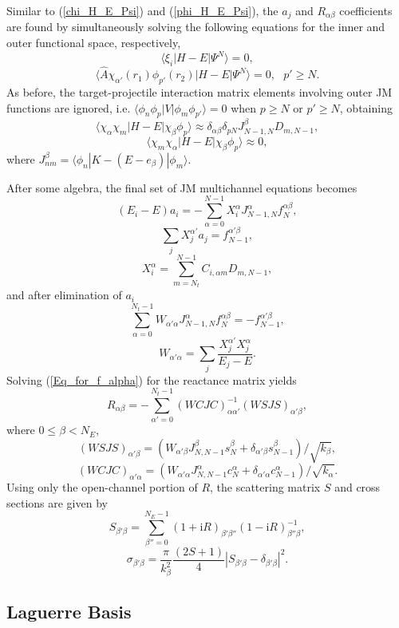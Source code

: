 \documentclass[aip,pra,showpacs,aps,twocolumn,groupedaddress,floatfix]{revtex4}
\newcommand{\beq}{\begin{equation}}
\newcommand{\eeq}{\end{equation}}
\begin{document}
Similar to (\ref{chi_H_E_Psi}) and (\ref{phi_H_E_Psi}), the $a_j$ and $R_{\alpha \beta}$ coefficients are found by
simultaneously solving the following equations for the inner and outer functional space, respectively,
\beq
\langle\xi_i|H-E|\Psi^N\rangle=0,  \label{xi_H_E_Psi}
\eeq
\beq
\langle \hat{A} \chi_{\alpha'}(r_1) \phi_{p'}(r_2)|H-E|\Psi^N\rangle=0 , \ \ \ p' \geq N. \label{chi_phi_H_E_Psi}
\eeq
As before, the target-projectile interaction matrix elements involving outer JM functions are ignored, i.e.
$\langle \phi_n \phi_{p} |V|\phi_{m} \phi_{p'} \rangle=0$ when $p \geq N$ or $p' \geq N$,
obtaining
\beq
\langle \chi_{\alpha} \chi_{m}|H-E|\chi_{\beta} \phi_p \rangle \approx
\delta_{\alpha \beta} \delta_{pN} J_{N-1, N}^{\beta} D_{m, N-1},
 \label{chi_chi_H_E_chi_phi}
\eeq
\beq
\langle \chi_{m} \chi_{\alpha} |H-E|\chi_{\beta} \phi_p \rangle \approx 0,
\eeq
where $J_{nm}^{\beta} = \langle \phi_n |K-(E-e_\beta)|\phi_m \rangle.$


After some algebra, the final set of JM multichannel equations becomes
\beq
(E_i - E) a_i = -\sum_{\alpha=0}^{N-1} X_i^{\alpha} J_{N-1,N}^{\alpha} f_N^{\alpha \beta},
\label{a_i}
\eeq
\beq
\sum_{j} X_j^{\alpha'} a_j = f_{N-1}^{\alpha' \beta},
\label{a_j}
\eeq
\beq
X_i^{\alpha} = \sum_{m=N_t}^{N-1}  C_{i,\alpha m} D_{m,N-1},
\eeq
and after elimination of $a_i$
\beq
 \sum_{\alpha=0}^{N_t-1}W_{\alpha' \alpha} J_{N-1,N}^{\alpha} f^{\alpha \beta}_N=-f_{N-1}^{\alpha' \beta},
\label{Eq_for_f_alpha}
\eeq
\beq
W_{\alpha' \alpha}= \sum_j \frac{X_j^{\alpha'}X_j^{\alpha}}{E_j-E}.
\label{W_alpha}
\eeq
Solving (\ref{Eq_for_f_alpha}) for the reactance matrix yields
\beq
R_{\alpha \beta} = - \sum_{\alpha'=0}^{N_t-1} (WCJC)_{\alpha \alpha'}^{-1} (WSJS)_{\alpha' \beta},
\label{R_alpha}
\eeq
where $0 \leq \beta < N_E$,
\beq
(WSJS)_{\alpha' \beta}= \left( W_{\alpha' \beta} J_{N,N-1}^{\beta} s_N^{\beta} + \delta_{\alpha' \beta}s_{N-1}^{\beta} \right) / \sqrt{k_{\beta}},
\label{S_alpha}
\eeq
\beq
(WCJC)_{\alpha' \alpha}= \left( W_{\alpha' \alpha} J_{N,N-1}^{\alpha} c_N^{\alpha} + \delta_{\alpha' \alpha}c_{N-1}^{\alpha} \right) / \sqrt{k_{\alpha}}.
\label{C_alpha}
\eeq
Using only the open-channel portion of $R$, the scattering matrix $S$ and cross sections are given by
\beq
S_{\beta' \beta} = \sum_{\beta''=0}^{N_E-1} (1+\mbox{i}R)_{\beta' \beta''} (1-\mbox{i}R)_{\beta'' \beta}^{-1},
\eeq
\beq
\sigma_{\beta' \beta} = \frac{\pi}{k_{\beta}^2}\frac{(2S+1)}{4}|S_{\beta' \beta} - \delta_{\beta' \beta}|^2.
\eeq




\subsection{Laguerre Basis}
\end{document}

